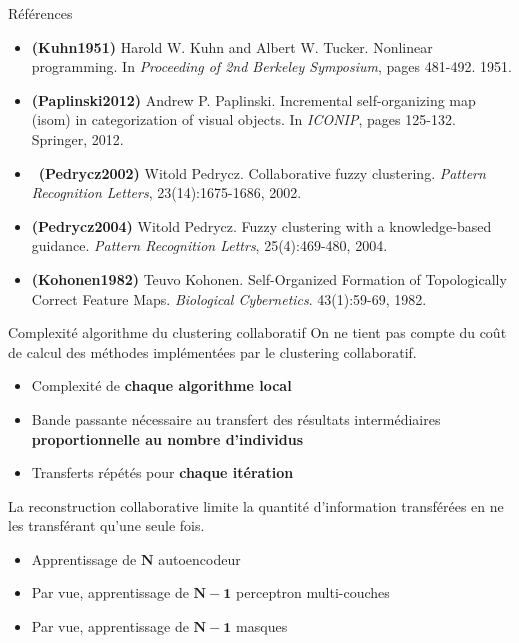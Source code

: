 \documentclass[hyperref={pdfpagelabels=false}]{beamer}
\begin{document}
    \begin{frame}{Références}
        \begin{itemize}
            \item \textbf{(Kuhn1951)} Harold W. Kuhn and Albert W. Tucker. Nonlinear
                programming. In \textit{Proceeding of 2nd Berkeley Symposium},
                pages 481-492. 1951.
            \item \textbf{(Paplinski2012)} Andrew P.
                Paplinski. Incremental self-organizing map (isom) in
                categorization of visual objects. In \textit{ICONIP}, pages
                125-132. Springer, 2012.
            \item \textbf{(Pedrycz2002)} Witold Pedrycz.
                Collaborative fuzzy clustering. \textit{Pattern Recognition
                Letters}, 23(14):1675-1686, 2002.
            \item \textbf{(Pedrycz2004)} Witold
                Pedrycz. Fuzzy clustering with a knowledge-based guidance.
                \textit{Pattern Recognition Lettrs}, 25(4):469-480, 2004.
            \item \textbf{(Kohonen1982)} Teuvo Kohonen. Self-Organized Formation of 
                Topologically Correct Feature Maps. \textit{Biological 
                Cybernetics}. 43(1):59-69, 1982.
        \end{itemize}
    \end{frame}

    \begin{frame}{Complexité algorithme du clustering collaboratif}
        On ne tient pas compte du coût de calcul des méthodes implémentées par le clustering collaboratif.

        \begin{itemize}
            \item Complexité de \textbf{chaque algorithme local}
            \item Bande passante nécessaire au transfert des résultats 
                intermédiaires \textbf{proportionnelle au nombre d'individus} 
        \item Transferts répétés pour \textbf{chaque itération}
    \end{itemize}

        La reconstruction collaborative limite la quantité d'information transférées en ne les transférant qu'une seule fois.

        \begin{itemize}
            \item Apprentissage de $\mathbf{N}$ autoencodeur
            \item Par vue, apprentissage de $\mathbf{N-1}$ perceptron 
                multi-couches
            \item Par vue, apprentissage de $\mathbf{N-1}$ masques
        \end{itemize}
    \end{frame}
\end{document}
